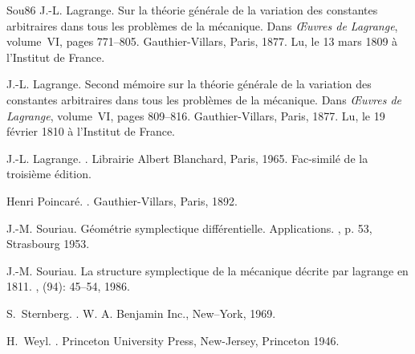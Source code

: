 \documentclass[12pt,paperletter, reqno]{amsart}
\theoremstyle{plain}
\theoremstyle{remark}
\begin{document}
\begin{thebibliography}{Sou86}
    J.-L. Lagrange.
    \newblock Sur la théorie générale de la variation des constantes arbitraires dans tous les problèmes de la mécanique.
    \newblock Dans {\em \OE uvres de Lagrange}, volume~VI, pages 771--805.
    Gauthier-Villars, Paris, 1877.
    \newblock Lu, le 13 mars 1809 à l'Institut de France.
    
    J.-L. Lagrange.
    \newblock Second mémoire sur la théorie générale de la variation des constantes arbitraires dans tous les problèmes de la mécanique.
    \newblock Dans {\em \OE uvres de Lagrange}, volume~VI, pages 809--816.
    Gauthier-Villars, Paris, 1877.
    \newblock Lu, le 19 février 1810 à l'Institut de France.
    
    J.-L. Lagrange.
    .
    \newblock Librairie Albert Blanchard, Paris, 1965.
    \newblock Fac-similé de la troisième édition.
    
    Henri Poincaré.
    .
    \newblock Gauthier-Villars, Paris, 1892.
    
    J.-M. Souriau.
    \newblock Géométrie symplectique différentielle. Applications.
    , p. 53, Strasbourg 1953.
    
    J.-M. Souriau.
    \newblock La structure symplectique de la mécanique décrite par lagrange en 1811.
    , (94): 45--54, 1986.
    
    S.~Sternberg.
    .
    \newblock W. A. Benjamin Inc., New--York, 1969.
    
    H.~Weyl.
    .
    \newblock Princeton University Press, New-Jersey, Princeton 1946.
    
  \end{thebibliography}
  
\end{document}
